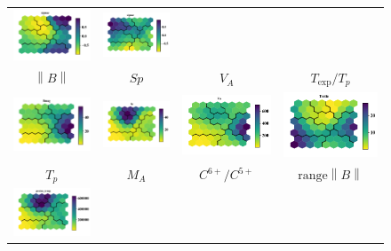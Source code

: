 \documentclass[utf8]{frontiersSCNS} %
\begin{document}
\begin{figure}[h!]
\begin{tabular}{CCCC}
		\includegraphics[width=4cm]{Amaya/comp-map-sigmac} &
		\includegraphics[width=4cm]{Amaya/comp-map-sigmar}\hfill
		\\
		$\left\lVert B \right\rVert $ & $Sp$ & $V_{A}$ & $T_{\text{exp}}/T_p$ \\
		\includegraphics[width=4cm]{Amaya/comp-map-log_Bmag} &
		\includegraphics[width=4cm]{Amaya/comp-map-log_Sp} &
		\includegraphics[width=4cm]{Amaya/comp-map-log_Va} &
		\includegraphics[width=4cm]{Amaya/comp-map-log_Tratio}\hfill
		\\
		$T_p$ & $M_A$ & $C^{6+}/C^{5+}$ & $\text{range} \left\lVert B \right\rVert $ \\
		\includegraphics[width=4cm]{Amaya/comp-map-log_proton_temp} &

\end{tabular}
\end{figure}
\end{document}
